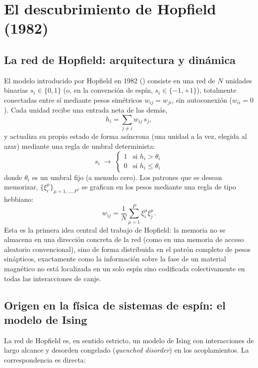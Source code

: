 \documentclass[12pt]{article}
\begin{document}
\section{El descubrimiento de Hopfield (1982)}

\subsection{La red de Hopfield: arquitectura y dinámica}

El modelo introducido por Hopfield en 1982 (\cite{hopfield1982}) consiste en una red de $N$ unidades binarias $s_i \in \{0,1\}$ (o, en la convención de espín, $s_i \in \{-1,+1\}$), totalmente conectadas entre sí mediante pesos simétricos $w_{ij}=w_{ji}$, sin autoconexión ($w_{ii}=0$). Cada unidad recibe una entrada neta de las demás,
\begin{equation}
h_i = \sum_{j\neq i} w_{ij}\, s_j ,
\end{equation}
y actualiza su propio estado de forma asíncrona (una unidad a la vez, elegida al azar) mediante una regla de umbral determinista:
\begin{equation}
s_i \;\longrightarrow\; \begin{cases} 1 & \text{si } h_i > \theta_i \\ 0 & \text{si } h_i \leq \theta_i \end{cases}
\end{equation}
donde $\theta_i$ es un umbral fijo (a menudo cero). Los patrones que se desean memorizar, $\{\xi^\mu_i\}_{\mu=1,\dots,P}$, se grafican en los pesos mediante una regla de tipo hebbiano:
\begin{equation}
w_{ij} = \frac{1}{N}\sum_{\mu=1}^{P} \xi_i^\mu \xi_j^\mu .
\end{equation}
Esta es la primera idea central del trabajo de Hopfield: la memoria no se almacena en una dirección concreta de la red (como en una memoria de acceso aleatorio convencional), sino de forma distribuida en el patrón completo de pesos sinápticos, exactamente como la información sobre la fase de un material magnético no está localizada en un solo espín sino codificada colectivamente en todas las interacciones de canje.

\subsection{Origen en la física de sistemas de espín: el modelo de Ising}

La red de Hopfield es, en sentido estricto, un modelo de Ising con interacciones de largo alcance y desorden congelado (\emph{quenched disorder}) en los acoplamientos. La correspondencia es directa:
\end{document}
